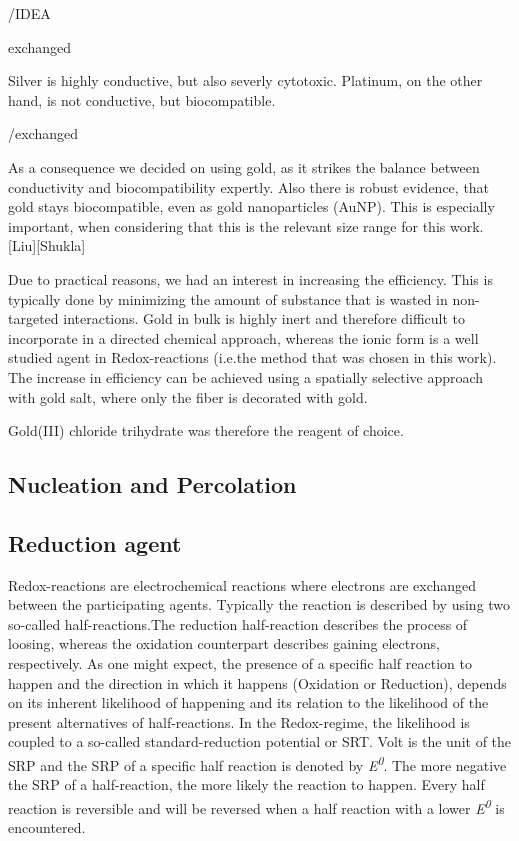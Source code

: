   /IDEA
  
  exchanged

  Silver is highly 
  conductive, but also severly cytotoxic. Platinum, on the other hand, is not conductive, 
  but biocompatible. 
  
  /exchanged


  As a consequence we decided on using gold, as it strikes the balance between conductivity and 
  biocompatibility expertly. Also there is robust evidence, that gold stays biocompatible, even 
  as gold nanoparticles (AuNP). This is especially important, when considering that this is the 
  relevant size range for this work. [Liu][Shukla]

Due to practical reasons, we had an interest in increasing the efficiency. This is typically done by minimizing the amount of substance that is wasted in non-targeted interactions. Gold in bulk is highly inert and therefore difficult to incorporate in a directed chemical approach, whereas the ionic form is a well studied agent in Redox-reactions (i.e.the method that was chosen in this work). The increase in efficiency can be achieved using a spatially selective approach with gold salt, where only the fiber is decorated with gold.

Gold(III) chloride trihydrate was therefore the reagent of choice.

\subsection{Nucleation and Percolation}
\label{subsec:Perc}




\subsection{Reduction agent}
\label{subsec:RedAgent}

Redox-reactions are electrochemical reactions where electrons are exchanged between 
the participating agents. Typically the reaction is described by using two so-called 
half-reactions.The reduction half-reaction describes the process of loosing, whereas the 
oxidation counterpart describes gaining electrons, respectively. As one might expect, the 
presence of a specific half reaction to happen and the direction in which it happens (Oxidation or Reduction),
 depends on its inherent likelihood of happening and its relation to the likelihood of the present alternatives 
 of half-reactions. In the Redox-regime, the likelihood is coupled to a so-called standard-reduction potential or \textsc{SRT}. Volt is the unit of the SRP and the SRP of a specific half reaction is denoted by \textit{E\textsuperscript{0}}.
 The more negative the SRP of a half-reaction, the more likely the reaction 
 to happen. Every half reaction is reversible and will be reversed when a half reaction with a lower 
 \textit{E\textsuperscript{0}} is encountered. \\[0.4cm]

